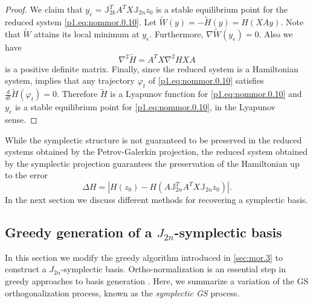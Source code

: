 {{\begin{proof}
We claim that $y_e = \mathbb J_{2k}^T A^T X \mathbb J_{2n} z_0$ is a stable equilibrium point for the reduced system \eqref{p1.eq:nommor.0.10}. Let $\tilde W (y) = -\tilde H (y) = H(XAy)$. Note that $\tilde W$ attains its local minimum at $y_e$. Furthermore, $\nabla \tilde W(y_e) = 0$. Also we have
\begin{equation}
	\nabla^2 \tilde H = A^T X \nabla^2 H X A
\end{equation}
is a positive definite matrix. Finally, since the reduced system is a Hamiltonian system,  implies that any trajectory $\varphi_t$ of \eqref{p1.eq:nommor.0.10} satisfies $\frac{d}{dt} \tilde H(\varphi_t) = 0$. Therefore $\tilde H$ is a Lyapunov function for \eqref{p1.eq:nommor.0.10} and $y_e$ is a stable equilibrium point for \eqref{p1.eq:nommor.0.10}, in the Lyapunov sense.

\end{proof}
}

While the symplectic structure is not guaranteed to be preserved in the reduced systems obtained by the Petrov-Galerkin projection, the reduced system obtained by the symplectic projection guarantees the preservation of the Hamiltonian up to the error
\begin{equation}
	\Delta H = | H(z_0) - H( A \mathbb J_{2n}^T A^T X \mathbb J_{2n} z_0) |.
\end{equation}
In the next section we discuss  different methods for recovering a symplectic basis.
}

\subsection{Greedy generation of a $J_{2n}$-symplectic basis} \label{sec:normmor.2}
In this section we modify the greedy algorithm introduced in \cref{sec:mor.3} to construct a $J_{2n}$-symplectic basis. Ortho-normalization is an essential step in greedy approaches to basis generation \cite{hesthaven2015certified,quarteroni2015reduced}. Here, we summarize a variation of the GS orthogonalization process, known as the \emph{symplectic GS} process.

